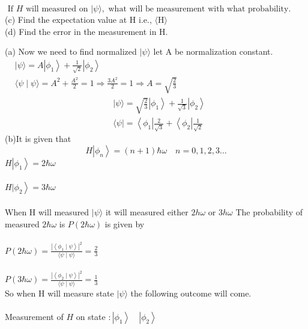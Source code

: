 \begin{enumerate}
\begin{minipage}{\textwidth}
	$\text { If } H \text { will measured on }|\psi\rangle, \text { what will be measurement with what probability. }$\\
	(c) Find the expectation value at $\mathrm{H}$ i.e., $\langle\mathrm{H}\rangle$\\
	(d) Find the error in the measurement in $\mathrm{H}$.
\end{minipage}
\begin{answer}
(a)	Now we need to find normalized $|\psi\rangle$ let A be normalization constant.\\
	$
	\begin{aligned}
	&|\psi\rangle=A\left|\phi_{1}\right\rangle+\frac{1}{\sqrt{2}}\left|\phi_{2}\right\rangle \\
	&\langle\psi \mid \psi\rangle=A^{2}+\frac{A^{2}}{2}=1 \Rightarrow \frac{3 A^{2}}{2}=1 \Rightarrow A=\sqrt{\frac{2}{3}}
	\end{aligned}
	$\\
\begin{align*}
		&|\psi\rangle=\sqrt{\frac{2}{3}}\left|\phi_{1}\right\rangle+\frac{1}{\sqrt{3}}\left|\phi_{2}\right\rangle \\
		&\langle\psi|=\left\langle\phi_{1}\right| \frac{2}{\sqrt{3}}+\left\langle\phi_{2}\right| \frac{1}{\sqrt{2}}
	\end{align*}
	(b)It is given that
	$$
	H\left|\phi_{n}\right\rangle=(n+1) \hbar \omega \quad n=0,1,2,3 \ldots
	$$
	$H\left|\phi_{1}\right\rangle=2 \hbar \omega$\\\\
	$\left.H| \phi_{2}\right\rangle=3 \hbar \omega$\\\\
	When $\mathrm{H}$ will measured $|\psi\rangle$ it will measured either $2 h \omega$ or $3 h \omega$ The probability of measured $2 \hbar \omega$ is $P(2 \hbar \omega)$ is given by\\\\
	$P(2 \hbar \omega)=\frac{\left|\left\langle\phi_{1} \mid \psi\right\rangle\right|^{2}}{\langle\psi \mid \psi\rangle}=\frac{2}{3}$\\\\
	$P(3 \hbar \omega)=\frac{\left|\left\langle\phi_{2} \mid \psi\right\rangle\right|^{2}}{\langle\psi \mid \psi\rangle}=\frac{1}{3}$\\
	So when $\mathrm{H}$ will measure state $|\psi\rangle$ the following outcome will come.\\\\
	Measurement of $H$ on state $:\left|\phi_{1}\right\rangle \quad\left|\phi_{2}\right\rangle$\\\\

\end{answer}
\end{enumerate}
